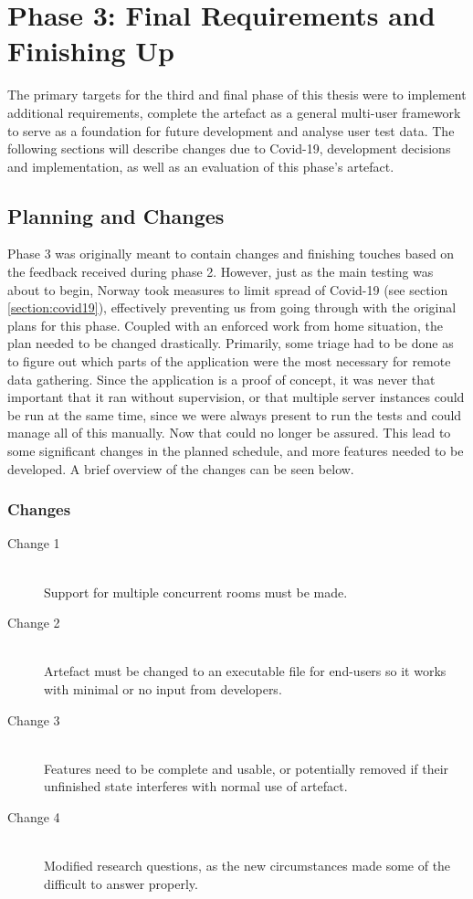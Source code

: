 
\chapter{Phase 3: Final Requirements and Finishing Up} 
\label{chap:7}
\label{chap:phase3}
The primary targets for the third and final phase of this thesis were to implement additional requirements, complete the artefact as a general multi-user framework to serve as a foundation for future development and analyse user test data. The following sections will describe changes due to Covid-19, development decisions and implementation, as well as an evaluation of this phase's artefact.                 


\section{Planning and Changes}
\label{section:planningandchanges}
Phase 3 was originally meant to contain changes and finishing touches based on the feedback received during phase 2. However, just as the main testing was about to begin, Norway took measures to limit spread of Covid-19 (see section \ref{section:covid19}), effectively preventing us from going through with the original plans for this phase. Coupled with an enforced work from home situation, the plan needed to be changed drastically. Primarily, some triage had to be done as to figure out which parts of the application were the most necessary for remote data gathering. Since the application is a proof of concept, it was never that important that it ran without supervision, or that multiple server instances could be run at the same time, since we were always present to run the tests and could manage all of this manually. Now that could no longer be assured. This lead to some significant changes in the planned schedule, and more features needed to be developed. A brief overview of the changes can be seen below.

\subsection{Changes}
\begin{description}
    \item [Change 1]\hfill \\
    Support for multiple concurrent rooms must be made. 
    \item [Change 2]\hfill \\
    Artefact must be changed to an executable file for end-users so it works with minimal or no input from developers.
    \item [Change 3]\hfill \\
    Features need to be complete and usable, or potentially removed if their unfinished state interferes with normal use of artefact.
    \item[Change 4]\hfill \\
    Modified research questions, as the new circumstances made some of the difficult to answer properly.
\end{description}

